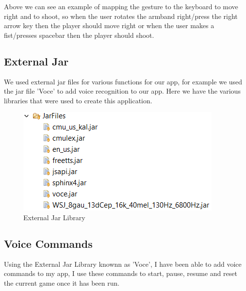 \documentclass{article}
\begin{document}
\hfill \break
Above we can see an example of mapping the gesture to the keyboard to move right and to shoot, so when the user rotates the armband right/press the right arrow key then the player should move right or when the user makes a fist/presses spacebar then the player should shoot.

\subsection{External Jar}

We used external jar files for various functions for our app, for example we used the jar file 'Voce' to add voice recognition to our app. Here we have the various libraries that were used to create this application.

\begin{figure}[h]
    \includegraphics[scale=0.6]{img/jarfiles.png}
    \centering
    \caption{External Jar Library}
    \label{fig: A Picture of used Jar Files}
\end{figure}

\subsection{Voice Commands}

Using the External Jar Library knownn as 'Voce', I have been able to add voice commands to my app, I use these commands to start, pause, resume and reset the current game once it has been run.
\end{document}
